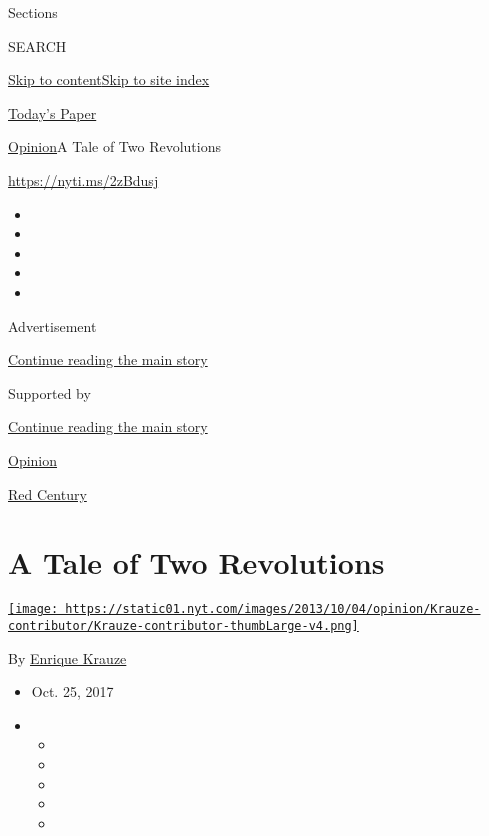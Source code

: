 Sections

SEARCH

\protect\hyperlink{site-content}{Skip to
content}\protect\hyperlink{site-index}{Skip to site index}

\href{https://myaccount.nytimes.com/auth/login?response_type=cookie\&client_id=vi}{}

\href{https://www.nytimes.com/section/todayspaper}{Today's Paper}

\href{/section/opinion}{Opinion}\textbar{}A Tale of Two Revolutions

\href{https://nyti.ms/2zBdusj}{https://nyti.ms/2zBdusj}

\begin{itemize}
\item
\item
\item
\item
\item
\end{itemize}

Advertisement

\protect\hyperlink{after-top}{Continue reading the main story}

Supported by

\protect\hyperlink{after-sponsor}{Continue reading the main story}

\href{/section/opinion}{Opinion}

\href{/column/red-century}{Red Century}

\hypertarget{a-tale-of-two-revolutions}{%
\section{A Tale of Two Revolutions}\label{a-tale-of-two-revolutions}}

\href{http://topics.nytimes.com/top/reference/timestopics/people/k/enrique_krauze/index.html}{\texttt{[image: https://static01.nyt.com/images/2013/10/04/opinion/Krauze-contributor/Krauze-contributor-thumbLarge-v4.png]}}

By
\href{http://topics.nytimes.com/top/reference/timestopics/people/k/enrique_krauze/index.html}{Enrique
Krauze}

\begin{itemize}
\item
  Oct. 25, 2017
\item
  \begin{itemize}
  \item
  \item
  \item
  \item
  \item
  \end{itemize}
\end{itemize}

